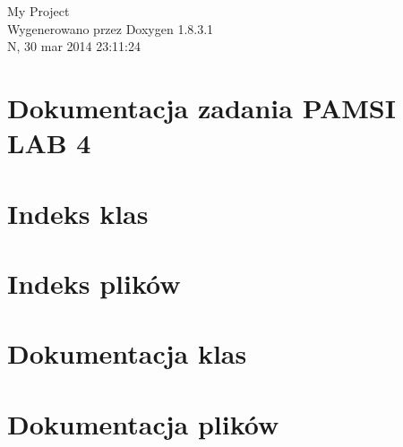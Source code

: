 \documentclass{book}
\begin{document}
\hypersetup{pageanchor=false,citecolor=blue}
\begin{titlepage}
\vspace*{7cm}
\begin{center}
{\Large My Project }\\
\vspace*{1cm}
{\large Wygenerowano przez Doxygen 1.8.3.1}\\
\vspace*{0.5cm}
{\small N, 30 mar 2014 23:11:24}\\
\end{center}
\end{titlepage}
\clearemptydoublepage
{}
\tableofcontents
\clearemptydoublepage
{}
\hypersetup{pageanchor=true,citecolor=blue}
\chapter{Dokumentacja zadania P\-A\-M\-S\-I L\-A\-B 4}
\label{index}\hypertarget{index}{}
\chapter{Indeks klas}

\chapter{Indeks plików}

\chapter{Dokumentacja klas}









\chapter{Dokumentacja plików}












\printindex
\end{document}
